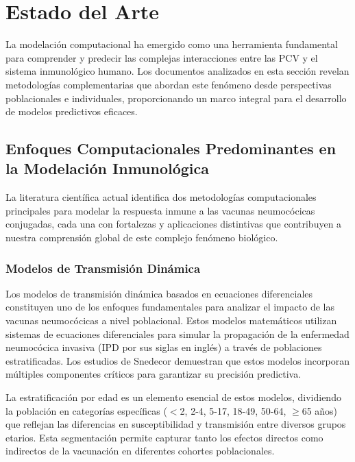 \chapter{Estado del Arte}\label{chapter:estadoarte}

La modelación computacional ha emergido como una herramienta fundamental para comprender y predecir las complejas interacciones entre las PCV y el sistema inmunológico humano. Los documentos analizados en esta sección revelan metodologías complementarias que abordan este fenómeno desde perspectivas poblacionales e individuales, proporcionando un marco integral para el desarrollo de modelos predictivos eficaces.

\section{Enfoques Computacionales Predominantes en la Modelación Inmunológica}

La literatura científica actual identifica dos metodologías computacionales principales para modelar la respuesta inmune a las vacunas neumocócicas conjugadas, cada una con fortalezas y aplicaciones distintivas que contribuyen a nuestra comprensión global de este complejo fenómeno biológico.

\subsection{Modelos de Transmisión Dinámica}

Los modelos de transmisión dinámica basados en ecuaciones diferenciales constituyen uno de los enfoques fundamentales para analizar el impacto de las vacunas neumocócicas a nivel poblacional. Estos modelos matemáticos utilizan sistemas de ecuaciones diferenciales para simular la propagación de la enfermedad neumocócica invasiva (IPD por sus siglas en inglés) a través de poblaciones estratificadas. Los estudios de Snedecor \cite{Snedecor2020a} demuestran que estos modelos incorporan múltiples componentes críticos para garantizar su precisión predictiva.

La estratificación por edad es un elemento esencial de estos modelos, dividiendo la población en categorías específicas ($<$2, 2-4, 5-17, 18-49, 50-64, $\geq$65 años) que reflejan las diferencias en susceptibilidad y transmisión entre diversos grupos etarios. Esta segmentación permite capturar tanto los efectos directos como indirectos de la vacunación en diferentes cohortes poblacionales.

